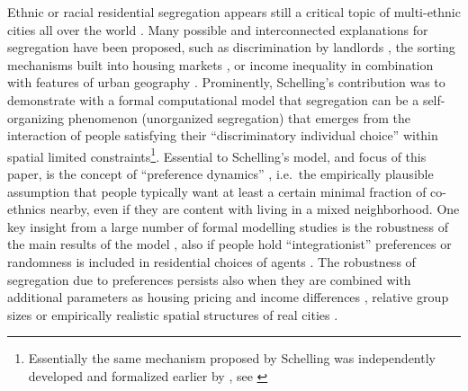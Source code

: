 \documentclass[
]{article}
\begin{document}
Ethnic or racial residential segregation appears still a critical topic
of multi-ethnic cities all over the world \citep{charles2003dynamics}.
Many possible and interconnected explanations for segregation have been
proposed, such as discrimination by landlords
\citep{ahmed2008discrimination}, the sorting mechanisms built into
housing markets \citep{bailey2012spatial}, or income inequality in
combination with features of urban geography
\citep{pais2017intergenerational}. Prominently, Schelling's contribution
was to demonstrate \citep{schelling1969models,schelling1971dynamic} with
a formal computational model that segregation can be a self-organizing
phenomenon (unorganized segregation) that emerges from the interaction
of people satisfying their ``discriminatory individual choice''
\cite[p. 488]{schelling1969models} within spatial limited
constraints\footnote{Essentially the same mechanism proposed by Schelling was independently developed and formalized earlier by \cite{sakoda1971checkerboard}, see \cite{hegselmann2017thomas}}.
Essential to Schelling's model, and focus of this paper, is the concept
of ``preference dynamics'' \citep{clark2008understanding}, i.e.~the
empirically plausible assumption that people typically want at least a
certain minimal fraction of co-ethnics nearby, even if they are content
with living in a mixed neighborhood. One key insight from a large number
of formal modelling studies is the robustness of the main results of the
model \citep{flache2020analytical}, also if people hold
``integrationist'' preferences \citep{zhang2004} or randomness is
included in residential choices of agents
\citep{bruch2006neighborhood,van2009neighborhood,bruch2009preferences}.
The robustness of segregation due to preferences persists also when they
are combined with additional parameters as housing pricing and income
differences \citep{fossett2006ethnic}, relative group sizes
\citep{bruch2014population} or empirically realistic spatial structures
of real cities \citep{benenson2009schelling}.
\end{document}
